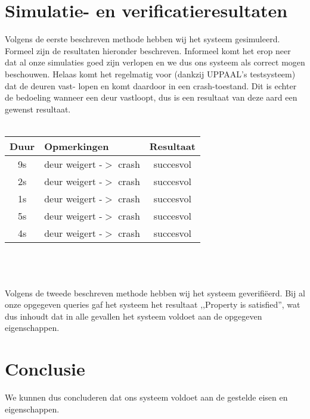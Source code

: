 \documentclass[]{report}
\begin{document}
    \chapter{Simulatie- en verificatieresultaten}
        Volgens de eerste beschreven methode hebben wij het systeem gesimuleerd. Formeel zijn de resultaten hieronder
        beschreven. Informeel komt het erop neer dat al onze simulaties goed zijn verlopen en we dus ons systeem als
        correct mogen beschouwen. Helaas komt het regelmatig voor (dankzij UPPAAL's testsysteem) dat de deuren vast-
        lopen en komt daardoor in een crash-toestand. Dit is echter de bedoeling wanneer een deur vastloopt, dus is
        een resultaat van deze aard een gewenst resultaat.\\
        \\
        \begin{tabular}{ c | l | c }
            Duur & Opmerkingen & Resultaat\\
            \hline
            9s & deur weigert -$>$ crash & succesvol\\
            2s & deur weigert -$>$ crash & succesvol\\
            1s & deur weigert -$>$ crash & succesvol\\
            5s & deur weigert -$>$ crash & succesvol\\
            4s & deur weigert -$>$ crash & succesvol\\
        \end{tabular}\\\\
        \\
        Volgens de tweede beschreven methode hebben wij het systeem geverifi\"eerd. Bij al onze opgegeven queries
        gaf het systeem het resultaat ,,Property is satisfied'', wat dus inhoudt dat in alle gevallen het systeem
        voldoet aan de opgegeven eigenschappen.\\

    \chapter{Conclusie}
        We kunnen dus concluderen dat ons systeem voldoet aan de gestelde eisen en eigenschappen.
\end{document}
